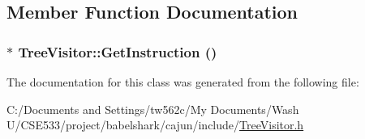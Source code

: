 \subsection{Member Function Documentation}
\hypertarget{class_tree_visitor_5aec3878d33d8942c16e1cfe38ca9371}{
\subsubsection[{GetInstruction}]{$\ast$ TreeVisitor::GetInstruction ()}}
\label{class_tree_visitor_5aec3878d33d8942c16e1cfe38ca9371}




The documentation for this class was generated from the following file:\begin{CompactItemize}
\item 
C:/Documents and Settings/tw562c/My Documents/Wash U/CSE533/project/babelshark/cajun/include/\hyperlink{_tree_visitor_8h}{TreeVisitor.h}\end{CompactItemize}
